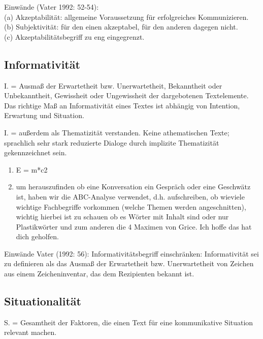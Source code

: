 \documentclass[
  letterpaper,
  DIV=11,
  numbers=noendperiod]{scrreprt}
\providecommand{\tightlist}{%
  \setlength{\itemsep}{0pt}\setlength{\parskip}{0pt}}\usepackage{longtable,booktabs,array}
\begin{document}
Einwände (Vater 1992: 52-54):\\
(a) Akzeptabilität: allgemeine Voraussetzung für erfolgreiches
Kommunizieren.\\
(b) Subjektivität: für den einen akzeptabel, für den anderen dagegen
nicht.\\
(c) Akzeptabilitätsbegriff zu eng eingegrenzt.

\hypertarget{informativituxe4t}{%
\subsection{Informativität}\label{informativituxe4t}}

I. = Ausmaß der Erwartetheit bzw. Unerwartetheit, Bekanntheit oder
Unbekanntheit, Gewissheit oder Ungewissheit der dargebotenen
Textelemente. Das richtige Maß an Informativität eines Textes ist
abhängig von Intention, Erwartung und Situation.

I. = außerdem als Thematizität verstanden. Keine athematischen Texte;
sprachlich sehr stark reduzierte Dialoge durch implizite Thematizität
gekennzeichnet sein.

\begin{enumerate}
\def\labelenumi{(\arabic{enumi})}
\setcounter{enumi}{16}
\tightlist
\item
  E = m*c2\\
\item
  um herauszufinden ob eine Konversation ein Gespräch oder eine
  Geschwätz ist, haben wir die ABC-Analyse verwendet, d.h. aufschreiben,
  ob wieviele wichtige Fachbegriffe vorkommen (welche Themen werden
  angeschnitten), wichtig hierbei ist zu schauen ob es Wörter mit Inhalt
  sind oder nur Plastikwörter und zum anderen die 4 Maximen von Grice.
  Ich hoffe das hat dich geholfen.\\
\end{enumerate}

Einwände Vater (1992: 56): Informativitätsbegriff einschränken:
Informativität sei zu definieren als das Ausmaß der Erwartetheit bzw.
Unerwartetheit von Zeichen aus einem Zeicheninventar, das dem
Rezipienten bekannt ist.

\hypertarget{situationalituxe4t}{%
\subsection{Situationalität}\label{situationalituxe4t}}

S. = Gesamtheit der Faktoren, die einen Text für eine kommunikative
Situation relevant machen.
\end{document}
